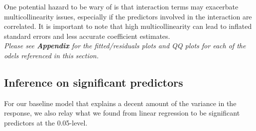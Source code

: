 \documentclass{article}
\begin{document}
One potential hazard to be wary of is that interaction terms may exacerbate multicollinearity issues, especially if the predictors involved in the interaction are correlated. It is important to note that high multicollinearity can lead to inflated standard errors and less accurate coefficient estimates. \\

\textit{Please see \textbf{Appendix} for the fitted/residuals plots and QQ plots for each of the odels referenced in this section.}

\subsection{Inference on significant predictors}

For our baseline model that explains a decent amount of the variance in the response, we also relay what we found from linear regression to be significant predictors at the 0.05-level. \\
\end{document}
